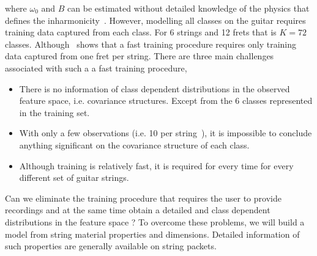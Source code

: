 \documentclass{article}
\begin{document}
\begin{sloppy}
where $\omega_0$ and $B$ can be estimated without detailed knowledge of the physics that defines the inharmonicity~\cite{ hjerrild::icassp19,abesser:automatic_string_detection_ml, barbancho:inharmonicity_tablature,michelson2018_aes}. 
However, modelling all classes on the guitar requires training data captured from each class. For 6 strings and 12 frets that is $K=72$  classes. Although~\cite{hjerrild::icassp19,barbancho:inharmonicity_tablature} shows that a fast training procedure requires only training data captured from one fret per string. There are three main challenges associated with such a a fast training procedure,%
\begin{itemize}
    \item There is no information of class dependent distributions in the observed feature space, i.e. covariance structures. Except from the 6 classes represented in the training set.
    \item With only a few observations (i.e. 10 per string~\cite{hjerrild::icassp19}), it is impossible to conclude anything significant on the covariance structure of each class.
    \item Although training is relatively fast, it is required for every time for every different set of guitar strings.
\end{itemize}
Can we eliminate the training procedure that requires the user to provide recordings and at the same time obtain a detailed and class dependent distributions in the feature space ? To overcome these problems, we will build a model from string material properties and dimensions. Detailed information of such properties are generally available on string packets.

%
%
%
%
%
%
%
%
%
%
%
%
%
% 

\end{sloppy}
\end{document}
